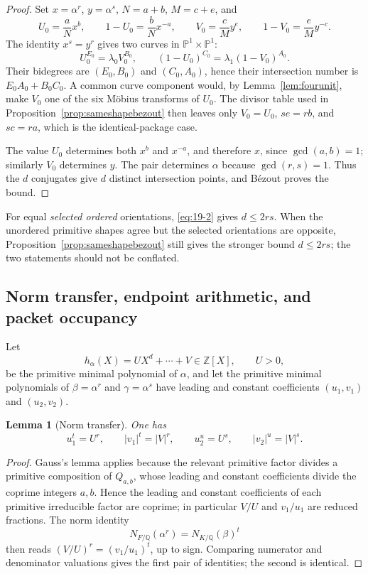 \documentclass[11pt]{article}
\numberwithin{equation}{section}
\newtheorem{lemma}[theorem]{Lemma}
\theoremstyle{definition}
\newcommand{\Q}{\mathbb Q}
\newcommand{\Z}{\mathbb Z}
\begin{document}
\begin{proof}
Set \(x=\alpha^r\), \(y=\alpha^s\), \(N=a+b\), \(M=c+e\), and
\[
 U_0=\frac aN x^b,\qquad 1-U_0=\frac bN x^{-a},
 \qquad
 V_0=\frac cM y^e,\qquad 1-V_0=\frac eM y^{-c}.
\]
The identity \(x^s=y^r\) gives two curves in
\(\mathbb P^1\times\mathbb P^1\):
\[
 U_0^{E_0}=\lambda_0V_0^{B_0},\qquad
 (1-U_0)^{C_0}=\lambda_1(1-V_0)^{A_0}.
\]
Their bidegrees are \((E_0,B_0)\) and \((C_0,A_0)\), hence their
intersection number is \(E_0A_0+B_0C_0\).  A common curve component would,
by Lemma~\ref{lem:fourunit}, make \(V_0\) one of the six M\"obius transforms
of \(U_0\).  The divisor table used in Proposition~\ref{prop:sameshapebezout}
then leaves only \(V_0=U_0\), \(se=rb\), and \(sc=ra\), which is the
identical-package case.

The value \(U_0\) determines both \(x^b\) and \(x^{-a}\), and therefore
\(x\), since \(\gcd(a,b)=1\); similarly \(V_0\) determines \(y\).  The
pair determines \(\alpha\) because \(\gcd(r,s)=1\).  Thus the \(d\)
conjugates give \(d\) distinct intersection points, and B\'ezout proves the
bound.
\end{proof}

For equal \emph{selected ordered} orientations, \eqref{eq:19-2} gives \(d\leq2rs\).
When the unordered primitive shapes agree but the selected orientations are
opposite, Proposition~\ref{prop:sameshapebezout} still gives the stronger
bound \(d\leq2rs\); the two statements should not be conflated.

\subsection{Norm transfer, endpoint arithmetic, and packet occupancy}

Let
\[
 h_\alpha(X)=UX^d+\cdots+V\in\Z[X],\qquad U>0,
\]
be the primitive minimal polynomial of \(\alpha\), and let the primitive
minimal polynomials of \(\beta=\alpha^r\) and \(\gamma=\alpha^s\) have
leading and constant coefficients \((u_1,v_1)\) and \((u_2,v_2)\).

\begin{lemma}[Norm transfer]\label{lem:normtransfer}
One has
\begin{equation}
 u_1^t=U^r,\qquad |v_1|^t=|V|^r,
 \qquad
 u_2^u=U^s,\qquad |v_2|^u=|V|^s.
 \label{eq:19-3}
\end{equation}
\end{lemma}

\begin{proof}
Gauss's lemma applies because the relevant primitive factor divides a
primitive composition of \(Q_{a,b}\), whose leading and constant
coefficients divide the coprime integers \(a,b\).  Hence the leading and
constant coefficients of each primitive irreducible factor are coprime; in
particular \(V/U\) and \(v_1/u_1\) are reduced fractions.  The norm identity
\[
 N_{F/\Q}(\alpha^r)=N_{K/\Q}(\beta)^t
\]
then reads \((V/U)^r=(v_1/u_1)^t\), up to sign.  Comparing numerator and
denominator valuations gives the first pair of identities; the second is
identical.
\end{proof}
\end{document}
